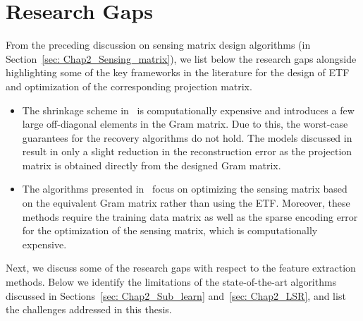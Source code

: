 \section{Research Gaps}
\label{sec: Chap2_gaps}
%
From the preceding discussion on sensing matrix design algorithms (in Section~\ref{sec: Chap2_Sensing_matrix}), we list below the research gaps alongside highlighting some of the key frameworks in the literature for the design of ETF and optimization of the corresponding projection matrix. 
%
\begin{itemize}
%
\item The shrinkage scheme in~\cite{Elad} is computationally expensive and introduces a few large off-diagonal elements in the Gram matrix. Due to this, the worst-case guarantees for the recovery algorithms do not hold. The models discussed in~\cite{HONG_sparse, HONG_robust} result in only a slight reduction in the reconstruction error as the projection matrix is obtained directly from the designed Gram matrix. 
\item The algorithms presented in~\cite{SRE_Huang, Gangli_robust} focus on optimizing the sensing matrix based on the equivalent Gram matrix rather than using the ETF. Moreover, these methods require the training data matrix as well as the sparse encoding error for the optimization of the sensing matrix, which is computationally expensive. 
%
\end{itemize} 
%
\noindent Next, we discuss some of the research gaps with respect to the feature extraction methods. Below we identify the limitations of the state-of-the-art algorithms discussed in Sections~\ref{sec: Chap2_Sub_learn} and~\ref{sec: Chap2_LSR}, and list the challenges addressed in this thesis.
%
